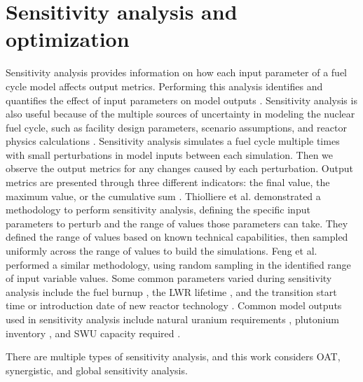 %
%
%
\section{Sensitivity analysis and optimization}
Sensitivity analysis provides information on how each input parameter 
of a fuel cycle model affects output metrics. 
Performing this analysis identifies and quantifies the effect of input 
parameters on model outputs \cite{thiolliere_methodology_2018}. Sensitivity 
analysis is also useful because of the multiple sources of uncertainty in 
modeling the nuclear fuel cycle, such as facility design parameters, 
scenario assumptions, and reactor physics calculations 
\cite{noauthor_effects_2017}.
Sensitivity 
analysis simulates a fuel cycle multiple times 
with small perturbations in model inputs between each simulation. Then 
we observe the output metrics for any changes caused by each  
perturbation. Output metrics are presented through three different 
indicators: the final value, the maximum value, or the cumulative sum 
\cite{noauthor_effects_2017}. Thiolliere et al. 
\cite{thiolliere_methodology_2018} demonstrated a methodology to 
perform sensitivity analysis, defining the specific input parameters to 
perturb and the range of values those parameters can take.
They defined the range of values based on known technical capabilities, then 
sampled uniformly across the range of values to build the simulations. 
Feng et al. \cite{feng_sensitivity_2020} performed a similar methodology, 
using random sampling in the identified range of input variable values.
Some common
parameters varied during sensitivity analysis include the fuel burnup 
\cite{thiolliere_methodology_2018,noauthor_effects_2017}, the \gls{LWR}
lifetime \cite{feng_sensitivity_2020,noauthor_effects_2017}, 
and the transition start time or introduction date of new reactor technology
\cite{chee_sensitivity_2019,passerini_systematic_2014,noauthor_effects_2017}. 
Common model outputs used in sensitivity analysis include 
natural uranium requirements 
\cite{richards_application_2021,noauthor_effects_2017},
plutonium inventory \cite{chee_sensitivity_2019,noauthor_effects_2017}, 
and \gls{SWU} 
capacity required \cite{richards_application_2021,noauthor_effects_2017}.

There are multiple types of sensitivity analysis, and this work considers 
\gls{OAT}, synergistic, and global sensitivity analysis. 

